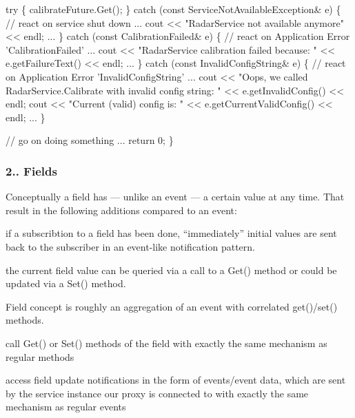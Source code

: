\begin{DoxyItemize}
\begin{DoxyCode}
 \textcolor{keywordflow}{try} \{
 calibrateFuture.Get();
 \} \textcolor{keywordflow}{catch} (\textcolor{keyword}{const} ServiceNotAvailableException& e) \{
 \textcolor{comment}{// react on service shut down ...}
 cout << \textcolor{stringliteral}{"RadarService not available anymore"} << endl;
 ...
 \} \textcolor{keywordflow}{catch} (\textcolor{keyword}{const} CalibrationFailed& e) \{
 \textcolor{comment}{// react on Application Error ’CalibrationFailed’ ...}
 cout << \textcolor{stringliteral}{"RadarService calibration failed because: "} << e.getFailureText() << endl;
 ...
 \} \textcolor{keywordflow}{catch} (\textcolor{keyword}{const} InvalidConfigString& e) \{
 \textcolor{comment}{// react on Application Error ’InvalidConfigString’ ...}
 cout << \textcolor{stringliteral}{"Oops, we called RadarService.Calibrate with invalid config string: "} << e.getInvalidConfig() << 
      endl;
 cout << \textcolor{stringliteral}{"Current (valid) config is: "} << e.getCurrentValidConfig() << endl;
 ...
 \}

 \textcolor{comment}{// go on doing something ...}
 \textcolor{keywordflow}{return} 0;
\}
\end{DoxyCode}

\end{DoxyItemize}

\subsubsection*{2.. Fields}


\begin{DoxyItemize}
\item Conceptually a field has — unlike an event — a certain value at any time. That result in the following additions compared to an event\+:
\begin{DoxyItemize}
\item if a subscribtion to a field has been done, “immediately” initial values are sent back to the subscriber in an event-\/like notification pattern.
\item the current field value can be queried via a call to a Get() method or could be updated via a Set() method.
\end{DoxyItemize}
\item Field concept is roughly an aggregation of an event with correlated get()/set() methods.
\begin{DoxyItemize}
\item call Get() or Set() methods of the field with exactly the same mechanism as regular methods
\item access field update notifications in the form of events/event data, which are sent by the service instance our proxy is connected to with exactly the same mechanism as regular events
\end{DoxyItemize}
\end{DoxyItemize}

